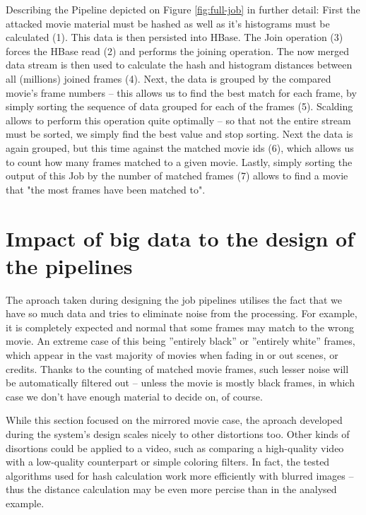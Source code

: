 Describing the Pipeline depicted on Figure \ref{fig:full-job} in further detail: First the attacked movie material must be hashed as well as it's histograms must be calculated (1). This data is then persisted into HBase. The Join operation (3) forces the HBase read (2) and performs the joining operation. The now merged data stream is then used to calculate the hash and histogram distances between all (millions) joined frames (4). Next, the data is grouped by the compared movie's frame numbers -- this allows us to find the best match for each frame, by simply sorting the sequence of data grouped for each of the frames (5). Scalding allows to perform this operation quite optimally -- so that not the entire stream must be sorted, we simply find the best value and stop sorting. Next the data is again grouped, but this time against the matched movie ids (6), which allows us to count how many frames matched to a given movie. Lastly, simply sorting the output of this Job by the number of matched frames (7) allows to find a movie that "the most frames have been matched to".


\section{Impact of big data to the design of the pipelines}
\label{sec:summing-up-analysis}

The aproach taken during designing the job pipelines utilises the fact that we have so much data and tries to eliminate noise from the processing. For example, it is completely expected and normal that some frames may match to the wrong movie. An extreme case of this being ''entirely black'' or ''entirely white'' frames, which appear in the vast majority of movies when fading in or out scenes, or credits. Thanks to the counting of matched movie frames, such lesser noise will be automatically filtered out -- unless the movie is mostly black frames, in which case we don't have enough material to decide on, of course.

While this section focused on the mirrored movie case, the aproach developed during the system's design scales nicely to other distortions too. Other kinds of disortions could be applied to a video, such as comparing a high-quality video with a low-quality counterpart or simple coloring filters. In fact, the tested algorithms used for hash calculation work more efficiently with blurred images -- thus the distance calculation may be even more percise than in the analysed example.

